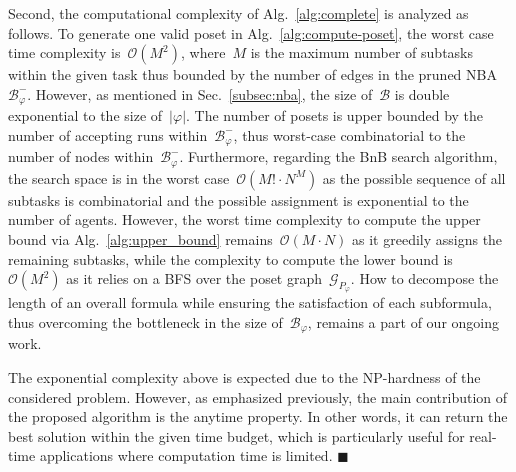 Second, the computational complexity of Alg.~\ref{alg:complete}
is analyzed as follows. To generate one valid poset in Alg.~\ref{alg:compute-poset},
the worst case time complexity is~$\mathcal{O}(M^2)$, where~$M$ is the maximum
number of subtasks within the given task thus bounded by the number of edges in the
pruned NBA~$\mathcal{B}^-_{\varphi}$.
However, as mentioned in Sec.~\ref{subsec:nba},
the size of~$\mathcal{B}$ is double exponential to the size of~$|\varphi|$.
The number of posets is upper bounded by the number of accepting runs
within~$\mathcal{B}^-_{\varphi}$, thus worst-case combinatorial to
the number of nodes within~$\mathcal{B}^-_{\varphi}$.
Furthermore, regarding the BnB search algorithm, the search space is in the worst
case~$\mathcal{O}(M!\cdot N^M)$ as the possible sequence of all subtasks
is combinatorial and the possible assignment is exponential to the
number of agents.
However, the worst time complexity to compute the upper bound via Alg.~\ref{alg:upper_bound}
remains~$\mathcal{O}(M\cdot N)$ as it greedily assigns the remaining subtasks,
while the complexity to compute the lower bound is~$\mathcal{O}(M^2)$ as it relies on a BFS over
the poset graph~$\mathcal{G}_{P_\varphi}$.
How to decompose the length of an overall formula while ensuring
the satisfaction of each subformula, thus overcoming the bottleneck
in the size of~$\mathcal{B}_{\varphi}$, remains a part of our ongoing work.

\begin{remark}\label{remark:anytime}
The exponential complexity above is expected due to the NP-hardness of the considered problem.
However, as emphasized previously, the main contribution of the proposed algorithm
is the anytime property.
In other words, it can return the best solution within the given time budget,
which is particularly useful for real-time applications where computation time is limited.
\hfill  $\blacksquare$
\end{remark}
